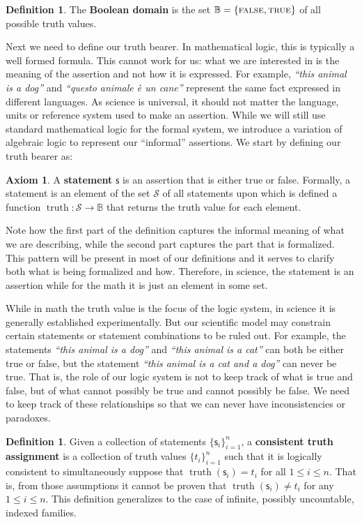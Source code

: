 \documentclass[letterpaper]{article}
\theoremstyle{plain}%
\theoremstyle{definition}
\newtheorem{defn}[thrm]{Definition}
\newtheorem{axiom}[thrm]{Axiom}
\theoremstyle{remark}
\numberwithin{equation}{section}
\DeclareMathOperator{\truth}{truth}
\def\TRUE{\textsc{true}}
\def\FALSE{\textsc{false}}
\newcommand{\stmt}[1][s] {\mathsf{#1}}
\newcommand{\statement}[1] {\emph{``#1''}}
\begin{document}
\begin{defn}
	The \textbf{Boolean domain} is the set $\mathbb{B} = \{\FALSE, \TRUE\}$ of all possible truth values.
\end{defn}

Next we need to define our truth bearer. In mathematical logic, this is typically a well formed formula. This cannot work for us: what we are interested in is the meaning of the assertion and not how it is expressed. For example, \statement{this animal is a dog} and \statement{questo animale \`e un cane} represent the same fact expressed in different languages. As science is universal, it should not matter the language, units or reference system used to make an assertion. While we will still use standard mathematical logic for the formal system, we introduce a variation of algebraic logic to represent our ``informal'' assertions. We start by defining our truth bearer as:

\begin{axiom}\label{ax_statement}
	A \textbf{statement} $\stmt$ is an assertion that is either true or false. Formally, a statement is an element of the set $\mathcal{S}$ of all statements upon which is defined a function $\truth: \mathcal{S} \to \mathbb{B}$ that returns the truth value for each element.
\end{axiom}

Note how the first part of the definition captures the informal meaning of what we are describing, while the second part captures the part that is formalized. This pattern will be present in most of our definitions and it serves to clarify both what is being formalized and how. Therefore, in science, the statement is an assertion while for the math it is just an element in some set.

While in math the truth value is the focus of the logic system, in science it is generally established experimentally. But our scientific model may constrain certain statements or statement combinations to be ruled out. For example, the statements \statement{this animal is a dog} and \statement{this animal is a cat} can both be either true or false, but the statement \statement{this animal is a cat and a dog} can never be true. That is, the role of our logic system is not to keep track of what is true and false, but of what cannot possibly be true and cannot possibly be false. We need to keep track of these relationships so that we can never have inconsistencies or paradoxes.

\begin{defn}
	Given a collection of statements $\{\stmt_i\}^n_{i=1}$, a \textbf{consistent truth assignment} is a collection of truth values $\{t_i\}^n_{i=1}$ such that it is logically consistent to simultaneously suppose that $\truth(\stmt_i) = t_i$ for all $1 \leq i \leq n$. That is, from those assumptions it cannot be proven that $\truth(\stmt_i) \neq t_i$ for any $1 \leq i \leq n$.  This definition generalizes to the case of infinite, possibly uncountable, indexed families.
\end{defn}
\end{document}
